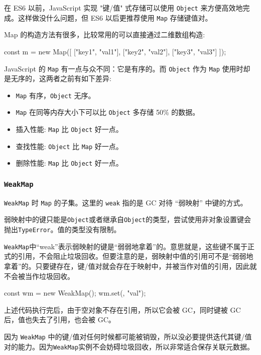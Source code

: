 在 ES6 以前，JavaScript 实现 "键/值" 式存储可以使用 \texttt{Object} 来方便高效地完成。这样做没什么问题，但 ES6 以后更推荐使用 \texttt{Map} 存储键值对。

Map 的构造方法有很多，比较常用的可以直接通过二维数组构造:

\begin{JavaScript}
const m = new Map([   
    ["key1", "val1"],    
    ["key2", "val2"],   
    ["key3", "val3"] 
]); 
\end{JavaScript}

JavaScript 的 \texttt{Map} 有一点与众不同：它是有序的。而 \texttt{Object} 作为 \texttt{Map} 使用时却是无序的，这两者之前有如下差异:
\begin{itemize}
    \item \texttt{Map} 有序，\texttt{Object} 无序。
    \item \texttt{Map} 在同等内存大小下可以比 \texttt{Object} 多存储 50\% 的数据。
    \item 插入性能: \texttt{Map} 比 \texttt{Object} 好一点。
    \item 查找性能: \texttt{Object} 比 \texttt{Map} 好一点。
    \item 删除性能: \texttt{Map} 比 \texttt{Object} 好一点。
\end{itemize}

\subsubsection{\texttt{WeakMap}}

\texttt{WeakMap} 时 \texttt{Map} 的子集。这里的 \texttt{weak} 指的是 GC 对待 ``弱映射'' 中键的方式。

弱映射中的键只能是\texttt{Object}或者继承自\texttt{Object}的类型，尝试使用非对象设置键会抛出\texttt{TypeError}。值的类型没有限制。

\texttt{WeakMap}中“weak”表示弱映射的键是“弱弱地拿着”的。意思就是，这些键不属于正式的引用，不会阻止垃圾回收。但要注意的是，弱映射中值的引用可不是“弱弱地拿着”的。只要键存在，键/值对就会存在于映射中，并被当作对值的引用，因此就不会被当作垃圾回收。

\begin{JavaScript}
const wm = new WeakMap(); 
wm.set({}, "val"); 
\end{JavaScript}

上述代码执行完后，由于空对象不存在引用，所以它会被 GC，同时键被 GC 后，值也失去了引用，也会被 GC。

因为 \texttt{WeakMap} 中的键/值对任何时候都可能被销毁，所以没必要提供迭代其键/值对的能力。因为\texttt{WeakMap}实例不会妨碍垃圾回收，所以非常适合保存关联元数据。

